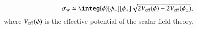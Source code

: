     \begin{equation}\label{eq:pertwalls:thinwall:surface_tension}
        \sigma\ped{w} \simeq \integ{\phi}[\phi_-][\phi_+] \sqrt{ 2V\ped{eff}(\phi)-2V\ped{eff}(\phi_\pm) },
    \end{equation}
    where $V_\mathrm{eff}(\phi)$ is the effective potential of the scalar field theory.



















